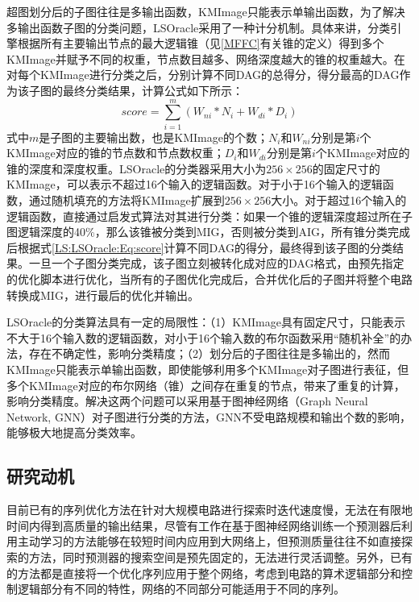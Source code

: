 超图划分后的子图往往是多输出函数，KMImage只能表示单输出函数，为了解决多输出函数子图的分类问题，LSOracle采用了一种计分机制。具体来讲，分类引擎根据所有主要输出节点的最大逻辑锥（见\ref{MFFC}有关锥的定义）得到多个KMImage并赋予不同的权重，节点数目越多、网络深度越大的锥的权重越大。在对每个KMImage进行分类之后，分别计算不同DAG的总得分，得分最高的DAG作为该子图的最终分类结果，计算公式如下所示：
\begin{equation}
\label{LS:LSOracle:Eq:score}
score = \sum_{i=1}^{m} ( W_{ni} * N_i +W_{di} *D_i )
\end{equation}
式中$m$是子图的主要输出数，也是KMImage的个数；$N_i$和$W_{ni}$分别是第$i$个KMImage对应的锥的节点数和节点数权重；$D_i$和$W_{di}$分别是第$i$个KMImage对应的锥的深度和深度权重。LSOracle的分类器采用大小为$256 \times 256$的固定尺寸的KMImage，可以表示不超过16个输入的逻辑函数。对于小于16个输入的逻辑函数，通过随机填充的方法将KMImage扩展到$256 \times 256$大小。对于超过16个输入的逻辑函数，直接通过启发式算法对其进行分类：如果一个锥的逻辑深度超过所在子图逻辑深度的40\%，那么该锥被分类到MIG，否则被分类到AIG，所有锥分类完成后根据式\eqref{LS:LSOracle:Eq:score}计算不同DAG的得分，最终得到该子图的分类结果。一旦一个子图分类完成，该子图立刻被转化成对应的DAG格式，由预先指定的优化脚本进行优化，当所有的子图优化完成后，合并优化后的子图并将整个电路转换成MIG，进行最后的优化并输出。

LSOracle的分类算法具有一定的局限性：（1）KMImage具有固定尺寸，只能表示不大于16个输入数的逻辑函数，对小于16个输入数的布尔函数采用“随机补全”的办法，存在不确定性，影响分类精度；（2）划分后的子图往往是多输出的，然而KMImage只能表示单输出函数，即使能够利用多个KMImage对子图进行表征，但多个KMImage对应的布尔网络（锥）之间存在重复的节点，带来了重复的计算，影响分类精度。解决这两个问题可以采用基于图神经网络（Graph Neural Network, GNN）对子图进行分类的方法，GNN不受电路规模和输出个数的影响，能够极大地提高分类效率。

\subsection{研究动机}

目前已有的序列优化方法\cite{LS:BOiLS,LS:DRiLLS}在针对大规模电路进行探索时迭代速度慢，无法在有限地时间内得到高质量的输出结果，尽管有工作\cite{LS:Bulls-Eye}在基于图神经网络训练一个预测器后利用主动学习的方法能够在较短时间内应用到大网络上，但预测质量往往不如直接探索的方法，同时预测器的搜索空间是预先固定的，无法进行灵活调整。另外，已有的方法都是直接将一个优化序列应用于整个网络，考虑到电路的算术逻辑部分和控制逻辑部分有不同的特性\cite{LS:MIG}，网络的不同部分可能适用于不同的序列。

